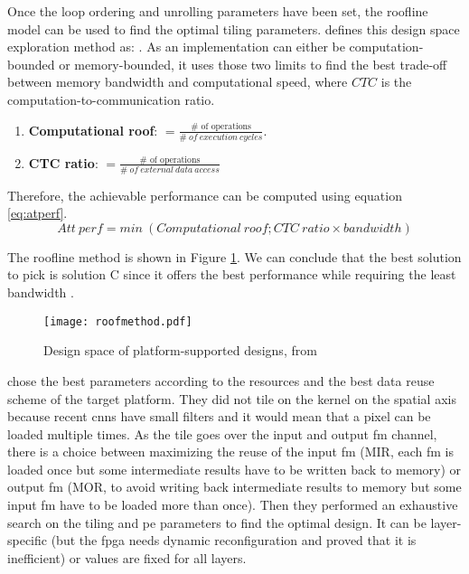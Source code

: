 Once the loop ordering and unrolling parameters have been set, the roofline model can be used to find the optimal tiling parameters. \textcite{mittal_survey_2020} defines this design space exploration method as: . As an implementation can either be computation-bounded or memory-bounded, it uses those two limits to find the best trade-off between memory bandwidth and computational speed, where $CTC$ is the computation-to-communication ratio.
\begin{enumerate}
    \item \textbf{Computational roof}: $= \frac{\text{\# \ of \ operations}}{\# \ of \ execution \ cycles}$.
    \item \textbf{CTC ratio}: $= \frac{\text{\# \ of \ operations}}{\# \ of \ external \ data \ access}$
\end{enumerate}
Therefore, the achievable performance can be computed using equation \ref{eq:atperf}.
\begin{equation}
Att \ perf = min \ (Computational \ roof; CTC \ ratio \times bandwidth)
\label{eq:atperf}
\end{equation}

The roofline method is shown in Figure \ref{fig:roofmeth}. We can conclude that the best solution to pick is solution C since it offers the best performance while requiring the least bandwidth \cite{zhang_optimizing_2015}.
%
\begin{figure}[H]
    \centering
    \texttt{[image: roofmethod.pdf]}
    \caption{Design space of platform-supported designs, from \cite{zhang_optimizing_2015}}
    \label{fig:roofmeth}
\end{figure}

\textcite{motamedi_placid_2017} chose the best parameters according to the resources and the best data reuse scheme of the target platform. They did not tile on the kernel on the spatial axis because recent \acrshort{cnn}s have small filters and it would mean that a pixel can be loaded multiple times. As the tile goes over the input and output \acrshort{fm} channel, there is a choice between maximizing the reuse of the input \acrshort{fm} (MIR, each \acrshort{fm} is loaded once but some intermediate results have to be written back to memory) or output \acrshort{fm} (MOR, to avoid writing back intermediate results to memory but some input \acrshort{fm} have to be loaded more than once). Then they performed an exhaustive search on the tiling and \acrshort{pe} parameters to find the optimal design. It can be layer-specific (but the \acrshort{fpga} needs dynamic reconfiguration and \textcite{zhang_optimizing_2015} proved that it is inefficient) or values are fixed for all layers.

